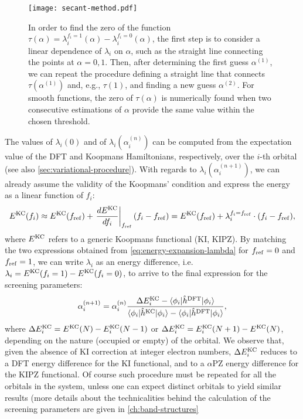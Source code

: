\begin{figure}
    \centering
    \texttt{[image: secant-method.pdf]}
    \caption[Secant method to determine the screening parameters]{In order to find the zero of the function $\tau(\alpha) = \lambda_i^{f_i=1}(\alpha) - \lambda_i^{f_i=0}(\alpha)$, the first step is to consider a linear dependence of $\lambda_i$ on $\alpha$, such as the straight line connecting the points at $\alpha=0,1$. Then, after determining the first guess $\alpha^{(1)}$, we can repeat the procedure defining a straight line that connects $\tau(\alpha^{(1)})$ and, e.g., $\tau(1)$, and finding a new guess $\alpha^{(2)}$. For smooth functions, the zero of $\tau(\alpha)$ is numerically found when two consecutive estimations of $\alpha$ provide the same value within the chosen threshold.}
    \label{fig:secant-method}
\end{figure}

The values of $\lambda_i(0)$ and of $\lambda_i(\alpha_i^{(n)})$ can be computed from the expectation value of the DFT and Koopmans Hamiltonians, respectively, over the $i$-th orbital (see also \cref{sec:variational-procedure}). With regards to $\lambda_i(\alpha_i^{(n+1)})$, we can already assume the validity of the Koopmans' condition and express the energy as a linear function of $f_i$:
%
\begin{equation}
    E^{\rm KC}(f_i) \approx E^{\rm KC}(f_{\rm ref}) + \left. \frac{dE^{\rm KC}}{df_i} \right|_{f_{\rm ref}} (f_i-f_{\rm ref}) =
    E^{\rm KC}(f_{\rm ref}) + \lambda_i^{f_i=f_{\rm ref}} \cdot (f_i-f_{\rm ref}) ,
    \label{eq:energy-expansion-lambda}
\end{equation}
%
where $E^{\rm KC}$ refers to a generic Koopmans functional (KI, KIPZ). By matching the two expressions obtained from \cref{eq:energy-expansion-lambda} for $f_{\rm ref} = 0$ and $f_{\rm ref} = 1$, we can write $\lambda_i$ as an energy difference, i.e. $\lambda_i = E^{\rm KC}(f_i=1) - E^{\rm KC}(f_i=0)$, to arrive to the final expression for the screening parameters:
%
\begin{equation}
    \alpha_i^{(n+1)} = \alpha_i^{(n)} \frac{\Delta E^{\rm KC}_i - \braket{\phi_i|\hat{h}^{\rm DFT}|\phi_i}}{\braket{\phi_i|\hat{h}^{\rm KC}|\phi_i} - \braket{\phi_i|\hat{h}^{\rm DFT}|\phi_i}} ,
    \label{eq:screening-parameter-iterative}
\end{equation}
%
where $\Delta E^{\rm KC}_i = E^{\rm KC}(N) - E^{\rm KC}_i(N-1)$ or $\Delta E^{\rm KC}_i = E^{\rm KC}_i(N+1) - E^{\rm KC}(N)$, depending on the nature (occupied or empty) of the orbital. We observe that, given the absence of KI correction at integer electron numbers, $\Delta E^{\rm KC}_i$ reduces to a DFT energy difference for the KI functional, and to a $\alpha$PZ energy difference for the KIPZ functional. Of course such procedure must be repeated for all the orbitals in the system, unless one can expect distinct orbitals to yield similar results (more details about the technicalities behind the calculation of the screening parameters are given in \cref{ch:band-structures}

